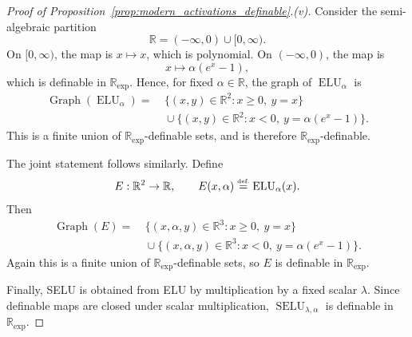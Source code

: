 \documentclass{article}
\newcommand{\eqdef}{\ensuremath{\stackrel{\mbox{\upshape\tiny def.}}{=}}}
\theoremstyle{plain}
\theoremstyle{definition}
\theoremstyle{remark}
\theoremstyle{plain}
\numberwithin{thm}{section}
\theoremstyle{definition}
\numberwithin{equation}{section}
\begin{document}
\begin{proof}[{Proof of Proposition~\ref{prop:modern_activations_definable}.(v)}]
Consider the semi-algebraic partition
\[
    \mathbb{R}=(-\infty,0)\cup[0,\infty).
\]
On \([0,\infty)\), the map is \(x\mapsto x\), which is polynomial. On
\((-\infty,0)\), the map is
\[
    x\mapsto \alpha(e^x-1),
\]
which is definable in \(\mathbb{R}_{\exp}\). Hence, for fixed
\(\alpha\in\mathbb{R}\), the graph of \(\operatorname{ELU}_{\alpha}\) is
\[
\begin{aligned}
    \operatorname{Graph}(\operatorname{ELU}_{\alpha})
    =
    &\ \{(x,y)\in\mathbb{R}^2:x\ge 0,\ y=x\} \\
    &\ \cup
    \{(x,y)\in\mathbb{R}^2:x<0,\ y=\alpha(e^x-1)\}.
\end{aligned}
\]
This is a finite union of \(\mathbb{R}_{\exp}\)-definable sets, and is
therefore \(\mathbb{R}_{\exp}\)-definable.

The joint statement follows similarly. Define
\[
    E:\mathbb{R}^2\to\mathbb{R},
    \qquad
    E(x,\alpha)\eqdef \operatorname{ELU}_{\alpha}(x).
\]
Then
\[
\begin{aligned}
    \operatorname{Graph}(E)
    =
    &\ \{(x,\alpha,y)\in\mathbb{R}^3:x\ge 0,\ y=x\} \\
    &\ \cup
    \{(x,\alpha,y)\in\mathbb{R}^3:x<0,\ y=\alpha(e^x-1)\}.
\end{aligned}
\]
Again this is a finite union of \(\mathbb{R}_{\exp}\)-definable sets, so \(E\)
is definable in \(\mathbb{R}_{\exp}\).

Finally, SELU is obtained from ELU by multiplication by a fixed scalar
\(\lambda\). Since definable maps are closed under scalar multiplication,
\(\operatorname{SELU}_{\lambda,\alpha}\) is definable in
\(\mathbb{R}_{\exp}\).
\end{proof}
\end{document}
